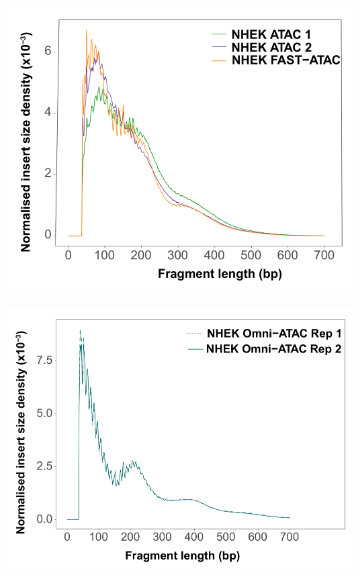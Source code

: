 \begin{figure}[htbp]
\centering
\begin{subfigure}{0.48\textwidth}
\centering
\includegraphics[width=\textwidth]{./Results1/pdfs/ATAC_NHEK_ATAC1_ATAC2_FAST_ATAC_fragment_size_distribution}
\caption{\textbf{}}
\end{subfigure}%
\begin{subfigure}{0.48\textwidth}
\centering
\includegraphics[width=\textwidth]{./Results1/pdfs/ATAC_NHEK_Omni_ATAC_fragment_size_distribution}
\caption{\textbf{}}
\end{subfigure}
\begin{subfigure}{0.5\textwidth}

\end{subfigure}
\end{figure}
